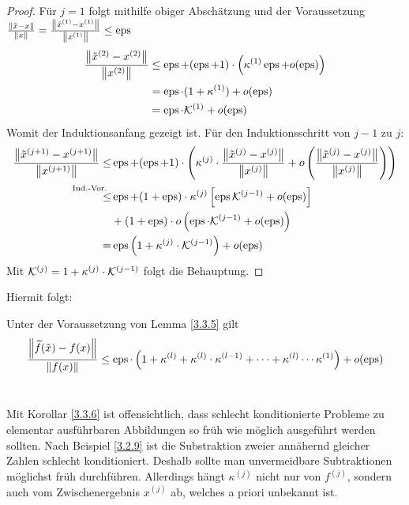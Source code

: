 \begin{Leme}[Fehlerfortpflanzung]
\begin{proof}
  Für $j=1$ folgt mithilfe obiger Abschätzung und der Voraussetzung 
  $\frac{\nn[\tilde{x}-x]}{\nn[x]} 
  = \frac{\nn[\tilde{x}^{(1)}-x^{(1)}]}{\nn[x^{(1)}]}\leq \Eps$ 
  \begin{align*}
    \frac{\nn[\tilde{x}^{(2)}-x^{(2)}]}{\nn[x^{(2)}]}
    & \leq \Eps +(\Eps+1) \cdot \left( \kappa^{(1)}\Eps+ o(\Eps)\right) \\
    &= \Eps\cdot(1+\kappa^{(1)}) + o(\Eps) \\
    &= \Eps\cdot\K^{(1)} + o(\Eps)
  \end{align*}
  Womit der Induktionsanfang gezeigt ist.
  Für den Induktionsschritt von $j-1$ zu $j$:
  \begin{align*}
    \frac{\nn[\tilde{x}^{(j+1)}-x^{(j+1)}]}{\nn[x^{(j+1)}]}
    \leq& \Eps + (\Eps+1) \cdot
          \left(
          \kappa^{(j)}\cdot \frac{\nn[\tilde{x}^{(j)}-x^{(j)}]}{\nn[x^{(j)}]}
          + o\left( 
          \frac{\nn[\tilde{x}^{(j)}-x^{(j)}]}{\nn[x^{(j)}]}
          \right)
          \right)\\
    \overset{\mathllap{\text{Ind.-Vor.}}}{\leq}
    & \Eps + (1+\Eps)
      \cdot\kappa^{(j)} \left[ \Eps \K^{(j-1)}+ o(\Eps) \right] \\
        &+ (1+\Eps) \cdot o\left( \Eps\cdot \K^{(j-1)} +o(\Eps)\right) \\
    =& \Eps\left(1+\kappa^{(j)}\cdot \K^{(j-1)}\right)+ o(\Eps)
  \end{align*}
  Mit $\K^{(j)} = 1+ \kappa^{(j)}\cdot \K^{(j-1)}$ folgt die Behauptung.
\end{proof}
\end{Leme}

Hiermit folgt:

\begin{Kore}
  \label{3.3.6}
  Unter der Voraussetzung von Lemma \ref{3.3.5} gilt
  \begin{gather}
    \frac{\nn[\widetilde{f}(\tilde{x})-f(x)]}{\nn[f(x)]} \leq 
    \Eps\cdot \left( 1+\kappa^{(l)}+ \kappa^{(l)}\cdot \kappa^{(l-1)}+ \dotsb
      + \kappa^{(l)}\dotsm\kappa^{(1)}\right) + o(\Eps) 
    \label{III.3.5}
  \end{gather}~
\end{Kore}

\begin{Beme}
  Mit Korollar \ref{3.3.6} ist offensichtlich, 
  dass schlecht konditionierte Probleme 
  zu elementar ausführbaren Abbildungen
  so früh wie möglich ausgeführt werden sollten. 
  Nach Beispiel \ref{3.2.9} ist die Substraktion 
  zweier annähernd gleicher Zahlen schlecht konditioniert.
  Deshalb sollte man unvermeidbare Subtraktionen möglichst früh durchführen.
  Allerdings hängt $\kappa^{(j)}$ nicht nur von $f^{(j)}$, sondern auch vom 
  Zwischenergebnis $x^{(j)}$ ab, welches a priori unbekannt ist.
\end{Beme}

